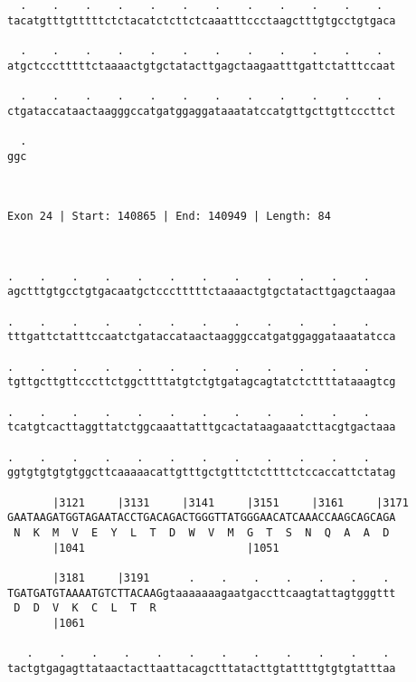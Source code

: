 \documentclass{article}
\begin{document}
\begin{Verbatim}
  .    .    .    .    .    .    .    .    .    .    .    .  
tacatgtttgtttttctctacatctcttctcaaatttccctaagctttgtgcctgtgaca
                                                            
  .    .    .    .    .    .    .    .    .    .    .    .  
atgctccctttttctaaaactgtgctatacttgagctaagaatttgattctatttccaat
                                                            
  .    .    .    .    .    .    .    .    .    .    .    .  
ctgataccataactaagggccatgatggaggataaatatccatgttgcttgttcccttct
                                                            
  .
ggc
   
   
 
Exon 24 | Start: 140865 | End: 140949 | Length: 84



.    .    .    .    .    .    .    .    .    .    .    .    
agctttgtgcctgtgacaatgctccctttttctaaaactgtgctatacttgagctaagaa
                                                            
.    .    .    .    .    .    .    .    .    .    .    .    
tttgattctatttccaatctgataccataactaagggccatgatggaggataaatatcca
                                                            
.    .    .    .    .    .    .    .    .    .    .    .    
tgttgcttgttcccttctggcttttatgtctgtgatagcagtatctcttttataaagtcg
                                                            
.    .    .    .    .    .    .    .    .    .    .    .    
tcatgtcacttaggttatctggcaaattatttgcactataagaaatcttacgtgactaaa
                                                            
.    .    .    .    .    .    .    .    .    .    .    .    
ggtgtgtgtgtggcttcaaaaacattgtttgctgtttctcttttctccaccattctatag
                                                            
       |3121     |3131     |3141     |3151     |3161     |3171
GAATAAGATGGTAGAATACCTGACAGACTGGGTTATGGGAACATCAAACCAAGCAGCAGA
 N  K  M  V  E  Y  L  T  D  W  V  M  G  T  S  N  Q  A  A  D 
       |1041                         |1051                  
  
       |3181     |3191      .    .    .    .    .    .    . 
TGATGATGTAAAATGTCTTACAAGgtaaaaaaagaatgaccttcaagtattagtgggttt
 D  D  V  K  C  L  T  R                                     
       |1061                                                
  
   .    .    .    .    .    .    .    .    .    .    .    . 
tactgtgagagttataactacttaattacagctttatacttgtattttgtgtgtatttaa
                                                            

\end{Verbatim}
\end{document}
